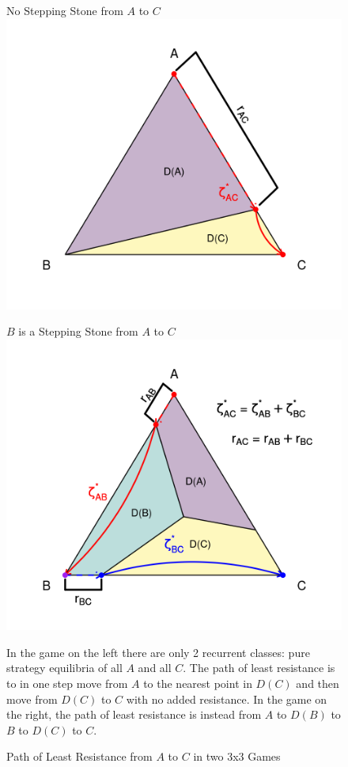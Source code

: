 \begin{figure}[h]
\captionsetup{justification=centering}
  \caption{Path of Least Resistance from $A$ to $C$ in two 3x3 Games}
   \label{fig:TreesTheory1}
\vskip12pt
\begin{minipage}[c]{.49\textwidth}
\centering
No Stepping Stone from $A$ to $C$
\vskip6pt
\includegraphics[width = \textwidth]{Images/Tree_1.png}
\end{minipage}
\begin{minipage}[c]{.49\textwidth}
\centering
$B$ is a Stepping Stone from $A$ to $C$
\vskip6pt
\includegraphics[width = \textwidth]{Images/Tree23.png}
\end{minipage}
\vskip12pt
\small
\centering
In the game on the left there are only 2 recurrent classes: pure strategy equilibria of all $A$ and all $C$. The path of least resistance is to in one step move from $A$ to the nearest point in $D(C)$ and then move from $D(C)$ to $C$ with no added resistance. In the game on the right, the path of least resistance is instead from $A$ to $D(B)$ to $B$ to $D(C)$ to $C$. 
\end{figure}
\justifying
\vskip12pt

